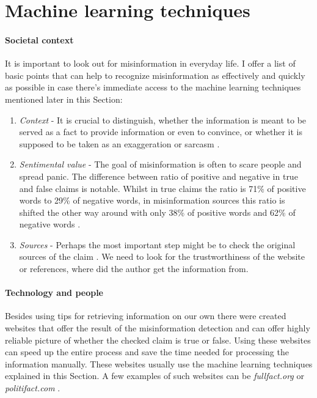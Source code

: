 \documentclass[11pt ,english,a4paper]{article}
\begin{document}
\section{Machine learning techniques} \label{tech}

\paragraph{Societal context}%
It is important to look out for misinformation in everyday life.
I offer a list of basic points that can help to recognize misinformation as effectively and quickly as possible in case there's immediate access to the machine learning techniques mentioned later in this Section: 
\begin{enumerate}[itemsep=-5pt]
\item{\emph{Context}} - It is crucial to distinguish, whether the information is meant to be served as a fact to provide information or even to convince, or whether it is supposed to be taken as an exaggeration or sarcasm \cite{alh18fact}.
\item {\emph{Sentimental value}} - The goal of misinformation is often to scare people and spread panic. The difference between ratio of positive and negative in true and false claims is notable. Whilst in true claims the ratio is 71\% of positive words to 29\% of negative words, in misinformation sources this ratio is shifted the other way around with only 38\% of positive words and 62\% of negative words \cite{bar21health}.
\item {\emph{Sources}} - Perhaps the most important step might be to check the original sources of the claim \cite{gra17fact}. We need to look for the trustworthiness of the website or references, where did the author get the information from.
\end{enumerate}

\paragraph{Technology and people}%
Besides using tips for retrieving information on our own there were created websites that offer the result of the misinformation detection and can offer highly reliable picture of whether the checked claim is true or false. Using these websites can speed up the entire process and save the time needed for processing the information manually. These websites usually use the machine learning techniques explained in this Section. A few examples of such websites can be \emph{fullfact.org} or \emph{politifact.com} \cite{alh18fact}.
\end{document}
